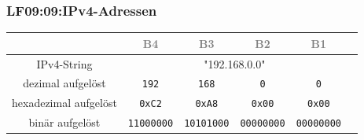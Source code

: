 
\begin{frame}[fragile]  
  \frametitle{LF09:09:IPv4-Adressen}
  \vspace{0.2cm}
  \begin{footnotesize}
  \begin{center}
    \renewcommand{\arraystretch}{1.5}
    \begin{tabular}{|c|c||c|c|c|c|}
    \hline
    &  \textcolor{gray}{\tiny{B4}} & \textcolor{gray}{\tiny{B3}} & \textcolor{gray}{\tiny{B2}} 
    & \textcolor{gray}{\tiny{B1}}  \\
	  \hline
    \hline
    IPv4-String & \multicolumn{4}{c|}{"192.168.0.0"} \\
    \hline
	  dezimal aufgelöst & \texttt{192} & \texttt{168} & \texttt{0} & \texttt{0} \\
    \hline
    hexadezimal aufgelöst & \texttt{0xC2} & \texttt{0xA8} & \texttt{0x00} & \texttt{0x00}\\
    \hline
    binär aufgelöst & \texttt{11000000} & \texttt{10101000} & \texttt{00000000} & \texttt{00000000}\\
    \hline
  \end{tabular}
\end{center}
\end{footnotesize}
\end{frame}

